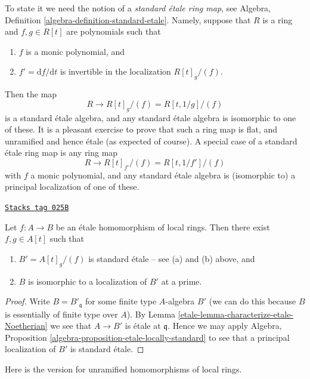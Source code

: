 \medskip\noindent
To state it we need the notion of a {\it standard \'etale ring map}, see
Algebra, Definition \ref{algebra-definition-standard-etale}.
Namely, suppose that $R$ is a ring and $f, g \in R[t]$ are polynomials
such that
\begin{enumerate}
\item[(a)] $f$ is a monic polynomial, and
\item[(b)] $f' = \text{d}f/\text{d}t$ is invertible in the localization
$R[t]_g/(f)$.
\end{enumerate}
Then the map
$$
R \longrightarrow R[t]_g/(f) = R[t, 1/g]/(f)
$$
is a standard \'etale algebra, and any standard \'etale algebra is isomorphic
to one of these. It is a pleasant exercise to prove that such a ring map
is flat, and unramified and hence \'etale (as expected of course).
A special case of a standard \'etale ring map is any ring map
$$
R \longrightarrow R[t]_{f'}/(f) = R[t, 1/f']/(f)
$$
with $f$ a monic polynomial, and any standard \'etale algebra is (isomorphic to)
a principal localization of one of these.

\begin{theorem}
\label{etale-theorem-structure-etale}
\href{https://stacks.math.columbia.edu/tag/025B}{\texttt{Stacks tag 025B}}

Let $f : A \to B$ be an \'etale homomorphism of local rings.
Then there exist $f, g \in A[t]$ such that
\begin{enumerate}
\item $B' = A[t]_g/(f)$ is standard \'etale -- see (a) and (b) above, and
\item $B$ is isomorphic to a localization of $B'$ at a prime.
\end{enumerate}
\end{theorem}

\begin{proof}

Write $B = B'_{\mathfrak q}$ for some finite type $A$-algebra $B'$
(we can do this because $B$ is essentially of finite type over $A$).
By Lemma \ref{etale-lemma-characterize-etale-Noetherian}
we see that $A \to B'$ is \'etale at $\mathfrak q$.
Hence we may apply
Algebra, Proposition \ref{algebra-proposition-etale-locally-standard}
to see that a principal localization of $B'$ is standard \'etale.
\end{proof}

Here is the version for unramified homomorphisms of local rings.

